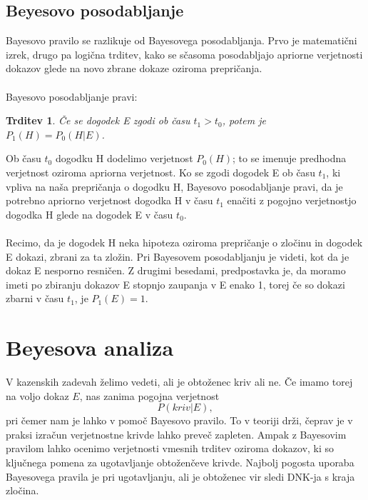 \documentclass[12pt,a4paper]{amsart}
\theoremstyle{definition} %
\theoremstyle{plain} %
\newtheorem{trditev}[definicija]{Trditev}
\begin{document}
\subsection{Beyesovo posodabljanje}
Bayesovo pravilo se razlikuje od Bayesovega posodabljanja. Prvo je matematični izrek, drugo pa logična trditev, kako se sčasoma posodabljajo 
apriorne verjetnosti dokazov glede na novo zbrane dokaze oziroma prepričanja.\\\\
Bayesovo posodabljanje pravi:
\begin{trditev}
Če se dogodek E zgodi ob času $t_1 > t_0$, potem je $P_1(H) = P_0(H \lvert E)$.
\end{trditev}
Ob času $t_0$ dogodku H dodelimo verjetnost $P_0(H)$; to se imenuje predhodna verjetnost oziroma apriorna verjetnost. Ko se zgodi dogodek E 
ob času $t_1$, ki vpliva na naša prepričanja o dogodku H, Bayesovo posodabljanje pravi, da je potrebno apriorno verjetnost dogodka H v času $t_1$ 
enačiti z pogojno verjetnostjo dogodka H glede na dogodek E v času $t_0$. \\\\
Recimo, da je dogodek H neka hipoteza oziroma prepričanje o zločinu in dogodek E dokazi, zbrani za ta zložin. Pri Bayesovem posodabljanju je videti, 
kot da je dokaz E nesporno resničen. Z drugimi besedami, predpostavka je, da moramo imeti po zbiranju dokazov E stopnjo zaupanja v E enako 1, 
torej če so dokazi zbarni v času $t_1$, je $P_1(E)=1$. 

\section{Beyesova analiza}
V kazenskih zadevah želimo vedeti, ali je obtoženec kriv ali ne. Če imamo torej na voljo dokaz $E$, nas zanima pogojna verjetnost
\[
    P(kriv \lvert E),
\] 
pri čemer nam je lahko v pomoč Bayesovo pravilo. To v teoriji drži, čeprav je v praksi izračun verjetnostne krivde lahko
preveč zapleten. Ampak z Bayesovim pravilom lahko ocenimo verjetnosti vmesnih trditev oziroma dokazov, ki so ključnega pomena za ugotavljanje
obtoženčeve krivde. Najbolj pogosta uporaba Bayesovega pravila je pri ugotavljanju, ali je obtoženec vir sledi DNK-ja s kraja zločina.
\end{document}
